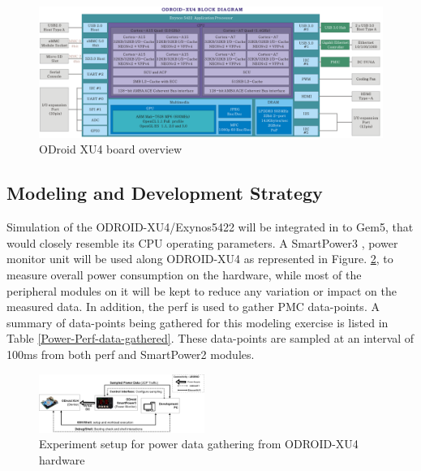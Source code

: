 \documentclass[conference]{IEEEtran}
\begin{document}
    \begin{figure}[bh]
        \includegraphics{rsrc/201506191222574523.png}
        \caption{ODroid XU4 board overview}
        \label{fig-odroid-hwoverview}
    \end{figure}

    \subsection{Modeling and Development Strategy}
        \par Simulation of the ODROID-XU4/Exynos5422 will be integrated in to Gem5, that would closely resemble its CPU operating parameters. A SmartPower3 \cite{odroid-smartpower3}, power monitor unit will be used along ODROID-XU4 as represented in Figure. \ref{fig-Experiment-setup}, to measure overall power consumption on the hardware, while most of the peripheral modules on it will be kept to reduce any variation or impact on the measured data. In addition, the perf\cite{2015137} is used to gather PMC data-points. A summary of data-points being gathered for this modeling exercise is listed in Table \ref{Power-Perf-data-gathered}. These data-points are sampled at an interval of 100ms from both perf and SmartPower2 modules.

        \begin{figure}[t]
            \centering
            \includegraphics[width=0.48\textwidth]{rsrc/Experiment-setup.drawio.png}
            \caption{Experiment setup for power data gathering from ODROID-XU4\cite{odroid-xu4} hardware}
            \label{fig-Experiment-setup}
        \end{figure}
\end{document}
